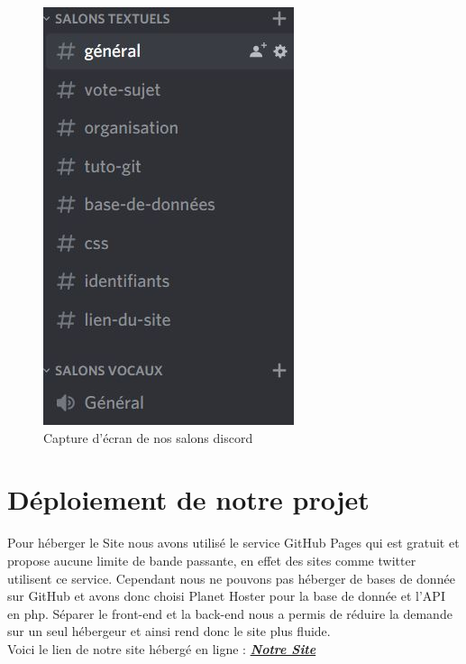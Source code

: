 \documentclass[12pt]{report}
\begin{document}
	\begin{figure}[h!]
	\begin{center}
		\includegraphics[scale=0.5]{discord.jpg}
	\end{center}
		\caption{Capture d'écran de nos salons discord}
\end{figure}

\section{Déploiement de notre projet}
Pour héberger le Site nous avons utilisé le service GitHub\cite{GitHub} Pages qui est gratuit et propose aucune limite de bande passante, en effet des sites comme twitter utilisent ce service.
Cependant nous  ne pouvons pas héberger de bases de donnée sur GitHub et avons donc choisi Planet Hoster\cite{Planet} pour la base de donnée et l'API en php. Séparer le front-end et la back-end nous a permis de réduire la demande sur un seul hébergeur et ainsi rend donc le site plus fluide.\\
Voici le lien de notre site hébergé en ligne :
\href{https://florentbednarek.github.io/projetwebEISTI}{\textbf{\emph{Notre Site}}}
\clearpage
\end{document}
